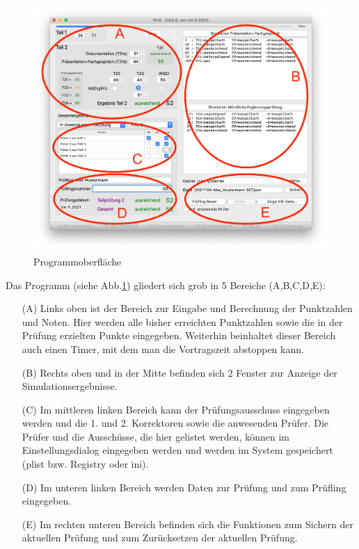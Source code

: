 \documentclass[a4paper,notitlepage,parskip=half]{scrartcl}
\begin{document}
\begin{figure}[ht]
	\centering
    \includegraphics[width=\textwidth]{Hauptfenster.png}
	\caption{Programmoberfläche}
	\label{fig:pihk}
\end{figure}

Das Programm (siehe Abb.\ref{fig:pihk}) gliedert sich grob in 5 Bereiche (A,B,C,D,E):

\begin{itemize}
\item[(A)] Links oben ist der Bereich zur Eingabe und Berechnung der Punktzahlen und Noten. 
Hier werden alle bisher erreichten Punktzahlen sowie die in der Prüfung erzielten Punkte eingegeben.
Weiterhin beinhaltet dieser Bereich auch einen Timer, mit dem man die Vortragszeit abstoppen kann.
\item[(B)] Rechts oben und in der Mitte befinden sich 2 Fenster zur Anzeige der Simulationsergebnisse.
\item[(C)] Im mittleren linken Bereich kann der Prüfungsausschuss eingegeben werden und die 1. und 2. Korrektoren sowie die anwesenden Prüfer. Die Prüfer und die Ausschüsse, die hier gelistet werden, können im Einstellungsdialog eingegeben werden und werden im System gespeichert (plist bzw. Registry oder ini).
\item[(D)] Im unteren linken Bereich werden Daten zur Prüfung und zum Prüfling eingegeben.
\item[(E)] Im rechten unteren Bereich befinden sich die Funktionen zum Sichern der aktuellen Prüfung und zum Zurücksetzen der aktuellen Prüfung.
\end{itemize} 
\end{document}
